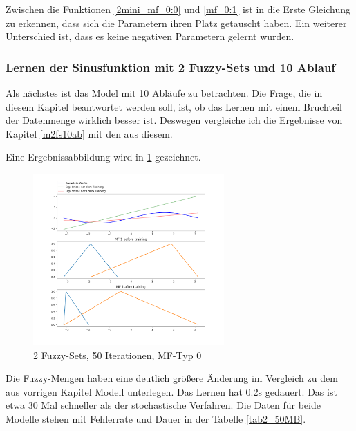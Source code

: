{Zwischen die Funktionen \ref{2mini_mf_0:0} und \ref{mf_0:1} ist in die Erste Gleichung zu erkennen, dass sich die Parametern ihren Platz getauscht haben. Ein weiterer Unterschied ist, dass es keine negativen Parametern gelernt wurden.


\subsubsection{Lernen der Sinusfunktion mit 2 Fuzzy-Sets und 10 Ablauf}
Als nächstes ist das Model mit 10 Abläufe zu betrachten. Die Frage, die in diesem Kapitel beantwortet werden soll, ist, ob das Lernen mit einem Bruchteil der Datenmenge wirklich besser ist. Deswegen vergleiche ich die Ergebnisse von Kapitel \ref{m2fs10ab} mit den aus diesem. 

Eine Ergebnissabbildung wird in \ref{2mini_batch50:0} gezeichnet.

\begin{figure}[htbp]
	\centering
	\includegraphics[width=0.65\textwidth]{images/sinus/Mini-Batch/sinus 1 Input 2 Sets 50 Epochs Mini-Batch Gradient Descent two equations mf.png}
	\caption{2 Fuzzy-Sets, 50 Iterationen, MF-Typ 0} \label{2mini_batch50:0}
\end{figure}

Die Fuzzy-Mengen haben eine deutlich größere Änderung im Vergleich zu dem aus vorrigen Kapitel Modell unterlegen. Das Lernen hat 0.2s gedauert. Das ist etwa 30 Mal schneller als der stochastische Verfahren. Die Daten für beide Modelle stehen mit Fehlerrate und Dauer in der Tabelle \ref{tab2_50MB}.

}
